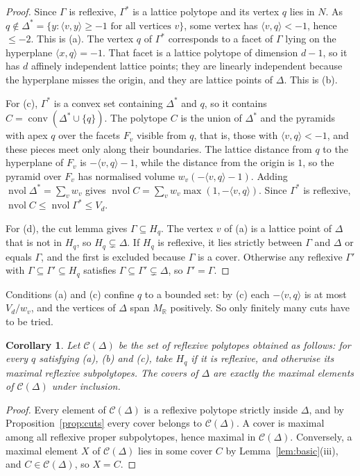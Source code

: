 \documentclass[11pt]{amsart}
\newtheorem{corollary}[theorem]{Corollary}
\theoremstyle{definition}
\theoremstyle{remark}
\newcommand{\R}{\mathbb{R}}
\newcommand{\ip}[2]{\langle #1,#2\rangle}
\newcommand{\conv}{\operatorname{conv}}
\newcommand{\nvol}{\operatorname{nvol}}
\begin{document}
\begin{proof}
Since $\Gamma$ is reflexive, $\Gamma^*$ is a lattice polytope and its
vertex $q$ lies in $N$. As $q\notin\Delta^*=\{y:\ip{v}{y}\ge-1\text{ for
all vertices }v\}$, some vertex has $\ip{v}{q}<-1$, hence $\le-2$. This is
(a). The vertex $q$ of $\Gamma^*$ corresponds to a facet of $\Gamma$ lying
on the hyperplane $\ip{x}{q}=-1$. That facet is a lattice polytope of
dimension $d-1$, so it has $d$ affinely independent lattice points; they
are linearly independent because the hyperplane misses the origin, and
they are lattice points of $\Delta$. This is (b).

For (c), $\Gamma^*$ is a convex set containing $\Delta^*$ and $q$, so it
contains $C=\conv(\Delta^*\cup\{q\})$. The polytope $C$ is the union of
$\Delta^*$ and the pyramids with apex $q$ over the facets $F_v$ visible
from $q$, that is, those with $\ip{v}{q}<-1$, and these pieces meet only
along their boundaries. The lattice distance from $q$ to the hyperplane of
$F_v$ is $-\ip{v}{q}-1$, while the distance from the origin is $1$, so the
pyramid over $F_v$ has normalised volume $w_v(-\ip{v}{q}-1)$. Adding
$\nvol\Delta^*=\sum_v w_v$ gives $\nvol C=\sum_v w_v\max(1,-\ip{v}{q})$.
Since $\Gamma^*$ is reflexive, $\nvol C\le\nvol\Gamma^*\le V_d$.

For (d), the cut lemma gives $\Gamma\subseteq H_q$. The vertex $v$ of (a)
is a lattice point of $\Delta$ that is not in $H_q$, so
$H_q\subsetneq\Delta$. If $H_q$ is reflexive, it lies strictly
between $\Gamma$ and $\Delta$ or equals $\Gamma$, and the first is excluded
because $\Gamma$ is a cover. Otherwise any reflexive $\Gamma'$ with
$\Gamma\subseteq\Gamma'\subseteq H_q$ satisfies
$\Gamma\subseteq\Gamma'\subsetneq\Delta$, so $\Gamma'=\Gamma$.
\end{proof}

Conditions (a) and (c) confine $q$ to a bounded set: by (c) each
$-\ip{v}{q}$ is at most $V_d/w_v$, and the vertices of $\Delta$ span $M_\R$
positively. So only finitely many cuts have to be tried.

\begin{corollary}\label{cor:covers}
Let $\mathcal{C}(\Delta)$ be the set of reflexive polytopes obtained as
follows: for every $q$ satisfying (a), (b) and (c), take $H_q$ if it
is reflexive, and otherwise its maximal reflexive subpolytopes. The covers
of $\Delta$ are exactly the maximal elements of $\mathcal{C}(\Delta)$
under inclusion.
\end{corollary}

\begin{proof}
Every element of $\mathcal{C}(\Delta)$ is a reflexive polytope strictly
inside $\Delta$, and by Proposition~\ref{prop:cuts} every cover belongs to
$\mathcal{C}(\Delta)$. A cover is maximal among all reflexive proper
subpolytopes, hence maximal in $\mathcal{C}(\Delta)$. Conversely, a maximal
element $X$ of $\mathcal{C}(\Delta)$ lies in some cover $C$ by
Lemma~\ref{lem:basic}(iii), and $C\in\mathcal{C}(\Delta)$, so $X=C$.
\end{proof}
\end{document}
